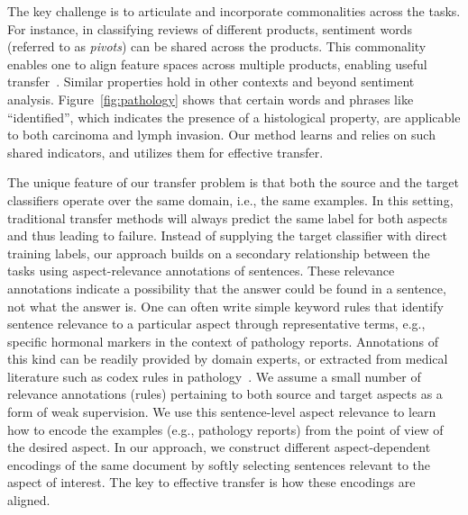 The key challenge is to articulate and incorporate commonalities across the tasks. For instance, in classifying reviews of different products, sentiment words (referred to as \emph{pivots}) can be shared across the products. This commonality enables one to align  feature spaces across multiple products, enabling useful transfer~\cite{blitzer2006domain}. Similar properties hold in other contexts and beyond sentiment analysis. Figure~\ref{fig:pathology} shows that certain words and phrases like ``identified'', which indicates the presence of a histological property, are applicable to both carcinoma and lymph invasion. Our method learns and relies on such shared indicators, and utilizes them for effective transfer. 

The unique feature of our transfer problem is that both the source and the target classifiers operate over the same domain, i.e., the same examples. In this setting, traditional transfer methods will always predict the same label for both aspects and thus leading to failure. Instead of supplying the target classifier with direct training labels, our approach builds on a secondary relationship between the tasks using aspect-relevance annotations of sentences. These relevance annotations indicate a possibility that the answer could be found in a sentence, not what the answer is. One can often write simple keyword rules that identify sentence relevance to a particular aspect through representative terms, e.g., specific hormonal markers in the context of pathology reports. Annotations of this kind can be readily provided by domain experts, or extracted from medical literature such as codex rules in pathology~\cite{pantanowitz2008informatics}. We assume a small number of relevance annotations (rules) pertaining to both source and target aspects as a form of weak supervision. We use this sentence-level aspect relevance to learn how to encode the examples (e.g., pathology reports) from the point of view of the desired aspect. In our approach, we construct different aspect-dependent encodings of the same document by softly selecting sentences relevant to the aspect of interest. The key to effective transfer is how these encodings are aligned. 

